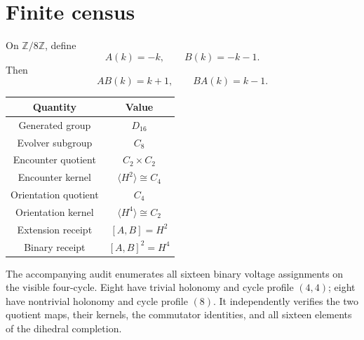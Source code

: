 \section{Finite census}

On \(\mathbb{Z}/8\mathbb{Z}\), define
\[
A(k)=-k,
\qquad
B(k)=-k-1.
\]
Then
\[
AB(k)=k+1,
\qquad
BA(k)=k-1.
\]

\begin{center}
\begin{tabular}{c|c}
Quantity & Value\\
\hline
Generated group & \(D_{16}\)\\
Evolver subgroup & \(C_8\)\\
Encounter quotient & \(C_2\times C_2\)\\
Encounter kernel & \(\langle H^2\rangle\cong C_4\)\\
Orientation quotient & \(C_4\)\\
Orientation kernel & \(\langle H^4\rangle\cong C_2\)\\
Extension receipt & \([A,B]=H^2\)\\
Binary receipt & \([A,B]^2=H^4\)
\end{tabular}
\end{center}

The accompanying audit enumerates all sixteen binary voltage
assignments on the visible four-cycle. Eight have trivial holonomy and
cycle profile \((4,4)\); eight have nontrivial holonomy and cycle
profile \((8)\). It independently verifies the two quotient maps,
their kernels, the commutator identities, and all sixteen elements of
the dihedral completion.
